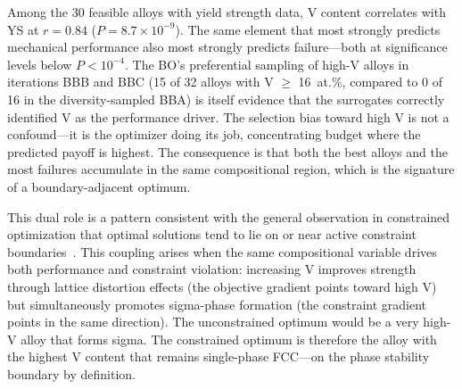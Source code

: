 Among the 30 feasible alloys with yield strength data, V content correlates with YS at $r = 0.84$ ($P = 8.7 \times 10^{-9}$). The same element that most strongly predicts mechanical performance also most strongly predicts failure---both at significance levels below $P < 10^{-4}$. The BO's preferential sampling of high-V alloys in iterations BBB and BBC (15 of 32 alloys with V $\geq$ 16~at.\%, compared to 0 of 16 in the diversity-sampled BBA) is itself evidence that the surrogates correctly identified V as the performance driver. The selection bias toward high V is not a confound---it is the optimizer doing its job, concentrating budget where the predicted payoff is highest. The consequence is that both the best alloys and the most failures accumulate in the same compositional region, which is the signature of a boundary-adjacent optimum.

This dual role is a pattern consistent with the general observation in constrained optimization that optimal solutions tend to lie on or near active constraint boundaries~\cite{ray2009infeasibility}. This coupling arises when the same compositional variable drives both performance and constraint violation: increasing V improves strength through lattice distortion effects (the objective gradient points toward high V) but simultaneously promotes sigma-phase formation (the constraint gradient points in the same direction). The unconstrained optimum would be a very high-V alloy that forms sigma. The constrained optimum is therefore the alloy with the highest V content that remains single-phase FCC---on the phase stability boundary by definition.

